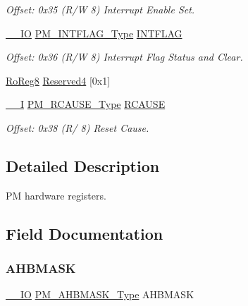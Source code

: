 \begin{DoxyCompactItemize}
\begin{DoxyCompactList}\small\item\em Offset\+: 0x35 (R/W 8) Interrupt Enable Set. \end{DoxyCompactList}\item 
\mbox{\hyperlink{core__cm0plus_8h_aec43007d9998a0a0e01faede4133d6be}{\+\_\+\+\_\+\+IO}} \mbox{\hyperlink{union_p_m___i_n_t_f_l_a_g___type}{P\+M\+\_\+\+I\+N\+T\+F\+L\+A\+G\+\_\+\+Type}} \mbox{\hyperlink{struct_pm_adfa200a3e057054c0adba278ece29454}{I\+N\+T\+F\+L\+AG}}
\begin{DoxyCompactList}\small\item\em Offset\+: 0x36 (R/W 8) Interrupt Flag Status and Clear. \end{DoxyCompactList}\item 
\mbox{\hyperlink{group___s_a_m_d21_e15_a__definitions_ga0d957f1433aaf5d70e4dc2b68288442d}{Ro\+Reg8}} \mbox{\hyperlink{struct_pm_a5ca570382e961b7801aeafc161de2571}{Reserved4}} \mbox{[}0x1\mbox{]}
\item 
\mbox{\hyperlink{core__cm0plus_8h_af63697ed9952cc71e1225efe205f6cd3}{\+\_\+\+\_\+I}} \mbox{\hyperlink{union_p_m___r_c_a_u_s_e___type}{P\+M\+\_\+\+R\+C\+A\+U\+S\+E\+\_\+\+Type}} \mbox{\hyperlink{struct_pm_a983353d43fb468f9c0e21eb89ce7903e}{R\+C\+A\+U\+SE}}
\begin{DoxyCompactList}\small\item\em Offset\+: 0x38 (R/ 8) Reset Cause. \end{DoxyCompactList}\end{DoxyCompactItemize}


\subsection{Detailed Description}
PM hardware registers. 

\subsection{Field Documentation}
\mbox{\label{struct_pm_a407d2530ed58b32aa72362a2a19f5a6b}} 
\subsubsection{\texorpdfstring{AHBMASK}{AHBMASK}}
{\footnotesize\ttfamily \mbox{\hyperlink{core__cm0plus_8h_aec43007d9998a0a0e01faede4133d6be}{\+\_\+\+\_\+\+IO}} \mbox{\hyperlink{union_p_m___a_h_b_m_a_s_k___type}{P\+M\+\_\+\+A\+H\+B\+M\+A\+S\+K\+\_\+\+Type}} A\+H\+B\+M\+A\+SK}



